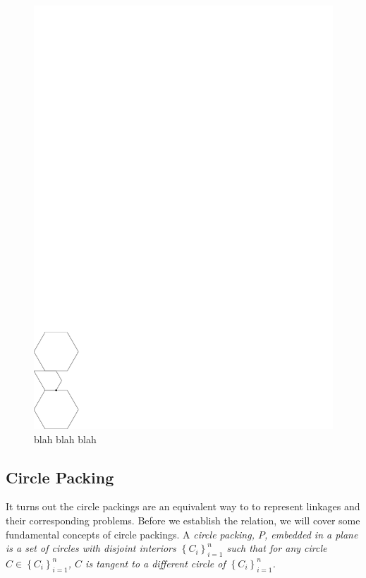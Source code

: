\begin{figure}[htbp]
\begin{center}
\includegraphics{graphics/LeftSwitchBetweenTwoPolygons.pdf}
\caption{blah blah blah}
\end{center} 
\end{figure} 

\subsection{Circle Packing}
It turns out the circle packings are an equivalent way to to represent linkages and their corresponding problems.  Before we establish the relation, we will cover some fundamental concepts of circle packings.  A \it{circle packing}, $P$, embedded in a plane  is a set of circles with disjoint interiors $\left\lbrace C_i \right\rbrace_{i = 1}^n $ such that for any circle $C \in \left\lbrace C_i \right\rbrace_{i = 1}^n$, $C$ is tangent to a different circle of $\left\lbrace C_i \right\rbrace_{i = 1}^n$. 

